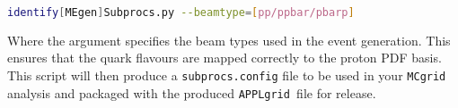 \documentclass[11pt]{article}
\newcommand{\mcgrid} {{\tt MCgrid }}
\newcommand{\appl} {{\tt APPLgrid }}
\begin{document}
\begin{lstlisting}[language=bash]
identify[MEgen]Subprocs.py --beamtype=[pp/ppbar/pbarp]
\end{lstlisting}

Where the argument specifies the beam types used in the event generation. This ensures that the quark flavours are mapped correctly to the proton PDF basis. This script will then produce a \lstinline[language=bash]{subprocs.config} file to be used in your \mcgrid analysis and packaged with the produced \appl file for release.  
\label{sec:subproc}
\end{document}
